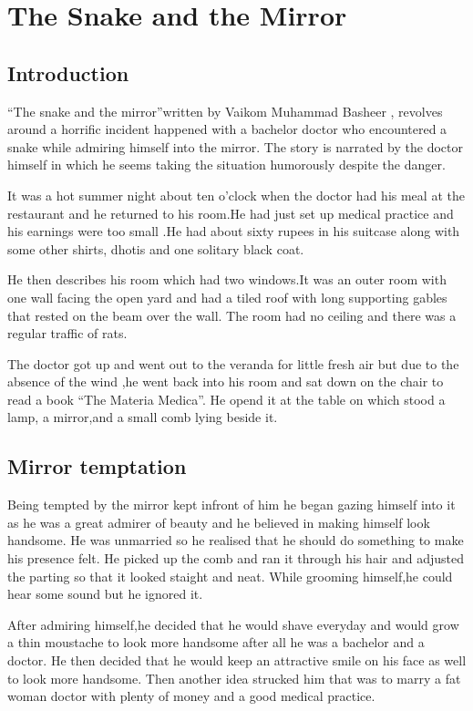 \documentclass[a4paper,12pt]{book}
\begin{document}
\chapter{The Snake and the Mirror}
\label{sec:org8953d4a}

\section{Introduction}
\label{sec:org2589f68}

“The snake and the mirror”written by Vaikom Muhammad Basheer , revolves around a horrific incident happened with a bachelor doctor who encountered a snake while admiring himself into the mirror. The story is narrated by the doctor himself in which he seems taking the situation humorously despite the danger.

It was a hot summer night about ten o’clock when the doctor had his meal at the restaurant and he returned to his room.He had just set up medical practice and his earnings were too small .He had about sixty rupees in his suitcase along with some other shirts, dhotis and one solitary black coat.

He then describes his room which had two windows.It was an outer room with one wall facing the open yard and had a tiled roof with long supporting gables that rested on the beam over the wall. The room had no ceiling and there was a regular traffic of rats.

The doctor got up and went out to the veranda for little fresh air but due to the absence of the wind ,he went back into his room and sat down on the chair to read a book “The Materia Medica”. He opend it at the table on which stood a lamp, a mirror,and a small comb lying beside it.
\section{Mirror temptation}
\label{sec:org9796ef2}


Being tempted by the mirror kept infront of him he began gazing himself into it as he was a great admirer of beauty and he believed in making himself look handsome. He was unmarried so he realised that he should do something to make his presence felt. He picked up the comb and ran it through his hair and adjusted the parting so that it looked staight and neat. While grooming himself,he could hear some sound but he ignored it.

After admiring himself,he decided that he would shave everyday and would grow a thin moustache to look more handsome after all he was a bachelor and a doctor. He then decided that he would keep an attractive smile on his face as well to look more handsome. Then another idea strucked him that was to marry a fat woman doctor with plenty of money and a good medical practice.
\end{document}
